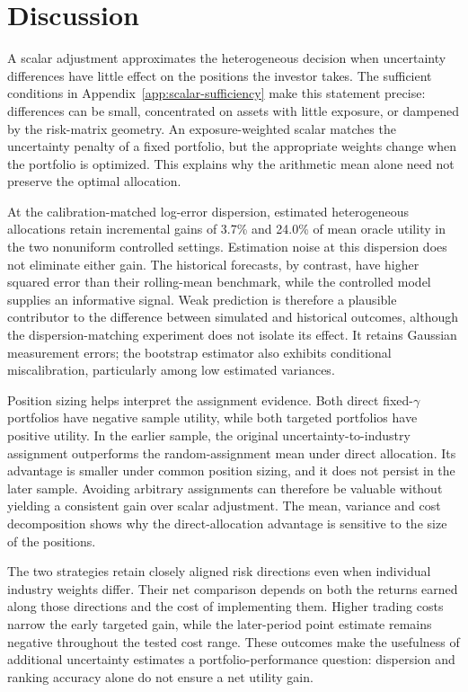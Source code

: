 \section{Discussion}
A scalar adjustment approximates the heterogeneous decision when uncertainty differences have little effect on the positions the investor takes. The sufficient conditions in Appendix~\ref{app:scalar-sufficiency} make this statement precise: differences can be small, concentrated on assets with little exposure, or dampened by the risk-matrix geometry. An exposure-weighted scalar matches the uncertainty penalty of a fixed portfolio, but the appropriate weights change when the portfolio is optimized. This explains why the arithmetic mean alone need not preserve the optimal allocation.

At the calibration-matched log-error dispersion, estimated heterogeneous allocations retain incremental gains of 3.7\% and 24.0\% of mean oracle utility in the two nonuniform controlled settings. Estimation noise at this dispersion does not eliminate either gain. The historical forecasts, by contrast, have higher squared error than their rolling-mean benchmark, while the controlled model supplies an informative signal. Weak prediction is therefore a plausible contributor to the difference between simulated and historical outcomes, although the dispersion-matching experiment does not isolate its effect. It retains Gaussian measurement errors; the bootstrap estimator also exhibits conditional miscalibration, particularly among low estimated variances.

Position sizing helps interpret the assignment evidence. Both direct fixed-$\gamma$ portfolios have negative sample utility, while both targeted portfolios have positive utility. In the earlier sample, the original uncertainty-to-industry assignment outperforms the random-assignment mean under direct allocation. Its advantage is smaller under common position sizing, and it does not persist in the later sample. Avoiding arbitrary assignments can therefore be valuable without yielding a consistent gain over scalar adjustment. The mean, variance and cost decomposition shows why the direct-allocation advantage is sensitive to the size of the positions.

The two strategies retain closely aligned risk directions even when individual industry weights differ. Their net comparison depends on both the returns earned along those directions and the cost of implementing them. Higher trading costs narrow the early targeted gain, while the later-period point estimate remains negative throughout the tested cost range. These outcomes make the usefulness of additional uncertainty estimates a portfolio-performance question: dispersion and ranking accuracy alone do not ensure a net utility gain.

